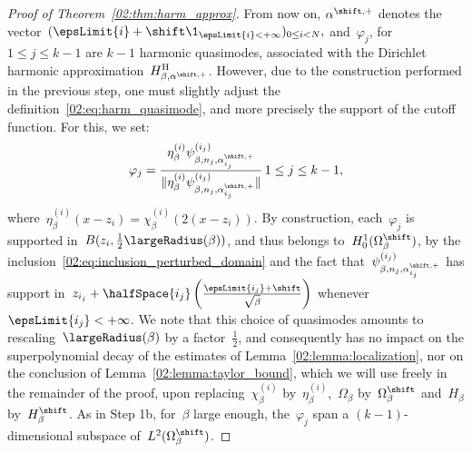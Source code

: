 \begin{proof}[Proof of Theorem~\ref{02:thm:harm_approx}]
        From now on, $\alpha^{\shift,+}$ denotes the vector~$(\epsLimit{i}+\shift\1_{\epsLimit{i}<+\infty})_{0\leq i<N},$
         and~$\varphi_{j}$, for~$1\leq j \leq k-1$ are $k-1$ harmonic quasimodes, associated with the Dirichlet harmonic approximation~$H^{\mathrm{H}}_{\beta,\alpha^{\shift,+}}$.
        However, due to the construction performed in the previous step, one must slightly adjust the definition~\eqref{02:eq:harm_quasimode}, and more precisely the support of the cutoff function.
        For this, we set:
        \[\varphi_j = \frac{\eta_\beta^{(i)}\psi_{\beta,n_j,\alpha^{\shift,+}_{i_j}}^{(i_j)}}{\|\eta_\beta^{(i)}\psi_{\beta,n_j,\alpha^{\shift,+}_{i_j}}^{(i_j)}\|}\,1\leq j\leq k-1,\]
        where~$\eta_\beta^{(i)}(x-z_i) = \chi_\beta^{(i)}(2(x-z_i))$.
        By construction, each~$\varphi_j$ is supported in~$B(z_i,\frac12\largeRadius(\beta))$, and thus belongs to~$H_0^1(\Omega_\beta^\shift)$, by the inclusion~\eqref{02:eq:inclusion_perturbed_domain} and the fact that~$\psi_{\beta,n_j,\alpha^{\shift,+}_{i_j}}^{(i_j)}$ has support in~$z_{i_j}+\halfSpace{i_j}\left(\frac{\epsLimit{i_j}+\shift}{\sqrt\beta}\right)$ whenever~$\epsLimit{i_j}<+\infty$.
        We note that this choice of quasimodes amounts to rescaling~$\largeRadius(\beta)$ by a factor~$\frac12$, and consequently has no impact on the superpolynomial decay of the estimates of Lemma~\ref{02:lemma:localization}, nor on the conclusion of Lemma~\ref{02:lemma:taylor_bound}, which we will use freely in the remainder of the proof, upon replacing~$\chi_\beta^{(i)}$ by~$\eta_\beta^{(i)}$,~$\Omega_\beta$ by~$\Omega_\beta^\shift$ and~$H_\beta$ by~$H_\beta^\shift$.
        As in Step 1b, for~$\beta$ large enough, the~$\varphi_j$ span a $(k-1)$-dimensional subspace of~$L^2(\Omega_\beta^\shift)$.
      

\end{proof}
